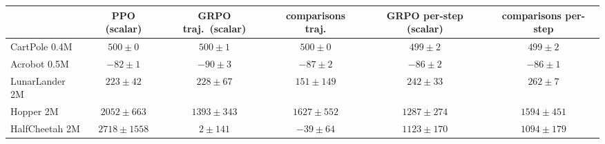 \begin{tabular}{lccccc}
\toprule
 & PPO (scalar) & GRPO traj.\ (scalar) & comparisons traj. & GRPO per-step (scalar) & comparisons per-step \\
\midrule
CartPole 0.4M & $500\pm0$ & $500\pm1$ & $500\pm0$ & $499\pm2$ & $499\pm2$ \\
Acrobot 0.5M & $-82\pm1$ & $-90\pm3$ & $-87\pm2$ & $-86\pm2$ & $-86\pm1$ \\
LunarLander 2M & $223\pm42$ & $228\pm67$ & $151\pm149$ & $242\pm33$ & $262\pm7$ \\
Hopper 2M & $2052\pm663$ & $1393\pm343$ & $1627\pm552$ & $1287\pm274$ & $1594\pm451$ \\
HalfCheetah 2M & $2718\pm1558$ & $2\pm141$ & $-39\pm64$ & $1123\pm170$ & $1094\pm179$ \\
\bottomrule
\end{tabular}
